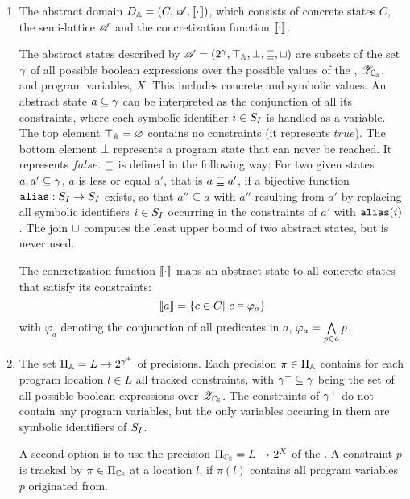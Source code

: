 \begin{enumerate}[leftmargin=*,label=\arabic*.]
\item The abstract domain $D_{\mathbb{A}} = (C, \mathscr{A}, \llbracket \cdot \rrbracket)$,
	which consists of concrete states $C$, the semi-lattice $\mathscr{A}$ and the concretization function $\llbracket \cdot \rrbracket$.
	
	The abstract states described by $\mathscr{A} = (2^\gamma, \top_{\mathbb{A}}, \bot, \sqsubseteq, \sqcup)$ are subsets of the set $\gamma$ of all possible boolean expressions over the possible values of the \symbolicValueAnalysisCPA, ${\mathscr{Z}_{\mathbb{C_{S}}}}$, and program variables, $X$. This includes concrete and symbolic values. An abstract state $a \subseteq \gamma$ can be interpreted as the conjunction of all its constraints, where each symbolic identifier $i \in S_I$ is handled as a variable.
	The top element $\top_{\mathbb{A}} = \varnothing$ contains no constraints (it represents $true$). The bottom element $\bot$ represents a program state that can never be reached. It represents $false$.
	$\sqsubseteq$ is defined in the following way: For two given states $a, a' \subseteq \gamma$, $a$ is less or equal $a'$, that is $a \sqsubseteq a'$, if a bijective function $\texttt{alias} : S_I \rightarrow S_I$ exists, so that $a'' \subseteq a$ with $a''$ resulting from $a'$ by replacing all symbolic identifiers $i \in S_I$ occurring in the constraints of $a'$ with $\texttt{alias}(i)$.
	The join $\sqcup$ computes the least upper bound of two abstract states, but is never used.

	The concretization function $\llbracket \cdot \rrbracket$ maps an abstract state to all concrete states that satisfy its constraints:
	\[ \llbracket a \rrbracket = \{ c \in C |\ c \vDash \varphi_a \} \]
	with $\varphi_a$ denoting the conjunction of all predicates in $a$, $\varphi_a = \bigwedge\limits_{p \in a} p$.

\item
The set $\Pi_{\mathbb{A}} = L \rightarrow 2^{{\gamma^+}}$ of precisions. Each precision $\pi \in \Pi_{\mathbb{A}}$ contains for each program location $l \in L$ all tracked constraints, with ${\gamma^+} \subseteq \gamma$ being the set of all possible boolean expressions over ${\mathscr{Z}_{\mathbb{C_{S}}}}$.
The constraints of ${\gamma^+}$ do not contain any program variables, but the only variables occuring in them are symbolic identifiers of $S_I$.

A second option is to use the precision $\Pi_{\mathbb{C_{S}}} = L \rightarrow 2^X$ of the \symbolicValueAnalysisCPA.
A constraint $p$ is tracked by $\pi \in \Pi_{\mathbb{C_{S}}}$ at a location $l$, if $\pi(l)$ contains all program variables $p$ originated from.


\end{enumerate}
